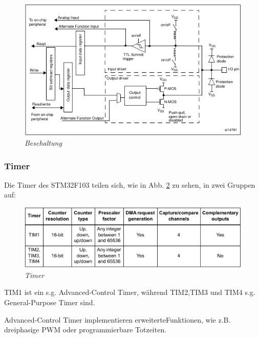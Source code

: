 \begin{figure}[h]
    \vspace{-\baselineskip}
        \centering
        \includegraphics[scale=0.6]{Pictures/gpio.png}
        \caption{\textit{Beschaltung \citep{STM32_Ref}}}
        \label{img:GPIO}
\end{figure}

\newpage


\subsubsection{Timer}

Die Timer des STM32F103 teilen sich, wie in Abb. \ref{img:Timer} zu sehen, in zwei Gruppen auf:

\vspace{0.5cm}
\begin{figure}[h]
    \vspace{-\baselineskip}
        \centering
        \includegraphics[scale=0.6]{Pictures/timer.png}
        \caption{\textit{Timer \citep{STM32_Datasheet}}}
        \label{img:Timer}
\end{figure}

TIM1 ist ein s.g. Advanced-Control Timer, während TIM2,TIM3 und TIM4 s.g. General-Purpose Timer sind. 

Advanced-Control Timer implementieren erweiterteFunktionen, wie z.B. dreiphasige PWM oder programmierbare Totzeiten\citep{STM32_Datasheet}. 

